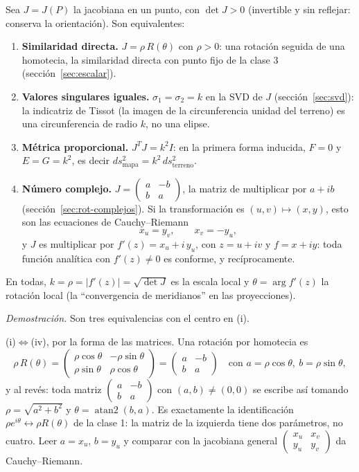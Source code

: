 \begin{resultado}
Sea \(J=J(P)\) la jacobiana en un punto, con \(\det J>0\) (invertible y sin reflejar:
conserva la orientación). Son equivalentes:
\begin{enumerate}[label=(\roman*)]
  \item \textbf{Similaridad directa.} \(J=\rho\,R(\theta)\) con \(\rho>0\): una rotación
  seguida de una homotecia, la similaridad directa con punto fijo de la clase 3
  (sección~\ref{sec:escalar}).
  \item \textbf{Valores singulares iguales.} \(\sigma_1=\sigma_2=k\) en la SVD de \(J\)
  (sección~\ref{sec:svd}): la indicatriz de Tissot (la imagen de la circunferencia unidad
  del terreno) es una circunferencia de radio \(k\), no una elipse.
  \item \textbf{Métrica proporcional.} \(J^TJ=k^2I\): en la primera forma inducida,
  \(F=0\) y \(E=G=k^2\), es decir \(ds^2_{\text{mapa}}=k^2\,ds^2_{\text{terreno}}\).
  \item \textbf{Número complejo.} \(J=\begin{pmatrix}a&-b\\b&a\end{pmatrix}\), la matriz
  de multiplicar por \(a+ib\) (sección~\ref{sec:rot-complejos}). Si la transformación es
  \((u,v)\mapsto(x,y)\), esto son las ecuaciones de Cauchy--Riemann
  \[
    x_u=y_v,\qquad x_v=-y_u ,
  \]
  y \(J\) es multiplicar por \(f'(z)=x_u+i\,y_u\), con \(z=u+iv\) y \(f=x+iy\): toda
  función analítica con \(f'(z)\neq0\) es conforme, y recíprocamente.
\end{enumerate}
En todas, \(k=\rho=|f'(z)|=\sqrt{\det J}\) es la escala local y \(\theta=\arg f'(z)\) la
rotación local (la ``convergencia de meridianos'' en las proyecciones).
\end{resultado}

\emph{Demostración.} Son tres equivalencias con el centro en (i).

(i)\(\Leftrightarrow\)(iv), por la forma de las matrices. Una rotación por homotecia es
\[
  \rho\,R(\theta)=\begin{pmatrix}\rho\cos\theta&-\rho\sin\theta\\ \rho\sin\theta&\rho\cos\theta\end{pmatrix}
  =\begin{pmatrix}a&-b\\b&a\end{pmatrix}\quad\text{con } a=\rho\cos\theta,\ b=\rho\sin\theta ,
\]
y al revés: toda matriz \(\begin{pmatrix}a&-b\\b&a\end{pmatrix}\) con \((a,b)\neq(0,0)\)
se escribe así tomando \(\rho=\sqrt{a^2+b^2}\) y \(\theta=\operatorname{atan2}(b,a)\). Es
exactamente la identificación \(\rho e^{i\theta}\leftrightarrow\rho R(\theta)\) de la
clase 1: la matriz de la izquierda tiene dos parámetros, no cuatro. Leer \(a=x_u\),
\(b=y_u\) y comparar con la jacobiana general
\(\begin{pmatrix}x_u&x_v\\y_u&y_v\end{pmatrix}\) da Cauchy--Riemann.


